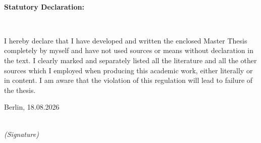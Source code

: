 \newpage

\thispagestyle{empty}

\begin{large}

\vspace*{6cm}

\

\large{ \textbf{Statutory Declaration:} }

\

\noindent
I hereby declare that I have developed and written the enclosed Master Thesis completely by myself and have not used sources or means without declaration in the text. 
I clearly marked and separately listed all the literature and all the other sources which I employed when producing this academic work, either literally or in content. 
I am aware that the violation of this regulation will lead to failure of the thesis.
\vspace{2cm}

\noindent
Berlin, 18.08.2026

\vspace{3cm}

\hspace*{7cm}%
\dotfill\\
\hspace*{8.5cm}%
\textit{(Signature)}

\end{large}
